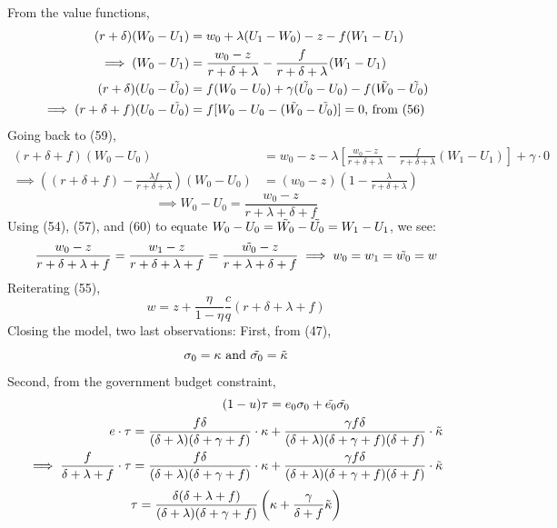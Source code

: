 \documentclass[12pt]{article} %
\theoremstyle{definition}
\begin{document}
From the value functions,
\begin{align*}
(r+\delta)(W_0-U_1)&=w_0+\lambda(U_1-W_0)-z-f(W_1-U_1) \\
\implies (W_0-U_1) &= \frac{w_0-z}{r+\delta+\lambda}-\frac{f}{r+\delta+\lambda}(W_1-U_1) \\
(r+\delta)(U_0-\Tilde{U_0})&=f(W_0-U_0)+\gamma(\Tilde{U_0}-U_0)-f(\Tilde{W_0}-\Tilde{U_0}) \\
\implies (r+\delta+f)(U_0-\Tilde{U_0})&=f[W_0-U_0-(\Tilde{W_0}-\Tilde{U_0})] = 0 \text{, from (56)}
\end{align*}
Going back to (59),
\begin{align*}
(r+\delta+f)(W_0-U_0)&=w_0-z-\lambda \left[ \frac{w_0-z}{r+\delta+\lambda}-\frac{f}{r+\delta+\lambda}(W_1-U_1) \right]+\gamma \cdot 0 \\
\implies \left((r+\delta+f)-\frac{\lambda f}{r+\delta+\lambda}\right)(W_0-U_0) &= (w_0-z)\left(1-\frac{\lambda}{r+\delta+\lambda} \right) 
\end{align*}
\begin{equation}
  \implies W_0-U_0 = \frac{w_0-z}{r+\lambda+\delta+f}
\end{equation}
Using (54), (57), and (60) to equate $ W_0-U_0=\Tilde{W_0}-\Tilde{U_0}=W_1-U_1$, we see:
\begin{equation}
 \frac{w_0-z}{r+\delta+\lambda+f}=\frac{w_1-z}{r+\delta+\lambda+f} = \frac{\Tilde{w_0}-z}{r+\lambda+\delta+f} \implies w_0=w_1=\Tilde{w_0}=w
\end{equation}
Reiterating (55), 
$$w = z + \frac{\eta}{1-\eta}\frac{c}{q}(r+\delta+\lambda+f)$$
Closing the model, two last observations: 
First, from (47), 
$$\sigma_0 = \kappa \text{ and } \Tilde{\sigma_0}=\Tilde{\kappa}$$
Second, from the government budget constraint, 
\begin{align*}
(1-u)\tau &= e_0\sigma_0 +\Tilde{e_0}\Tilde{\sigma_0} \\
e \cdot \tau = \frac{f\delta}{(\delta+\lambda)(\delta+\gamma+f)}\cdot \kappa &+ \frac{\gamma f\delta}{(\delta+\lambda)(\delta+\gamma+f)(\delta+f)}\cdot \Tilde{\kappa} \\
\implies \frac{f}{\delta+\lambda+f} \cdot \tau = \frac{f\delta}{(\delta+\lambda)(\delta+\gamma+f)}\cdot \kappa &+ \frac{\gamma f\delta}{(\delta+\lambda)(\delta+\gamma+f)(\delta+f)}\cdot \Tilde{\kappa}
\end{align*}
\begin{equation}
    \tau = \frac{\delta(\delta+\lambda+f)}{(\delta+\lambda)(\delta+\gamma+f)}\left( \kappa + \frac{\gamma}{\delta+f} \Tilde{\kappa}\right)
\end{equation}
\end{document}
